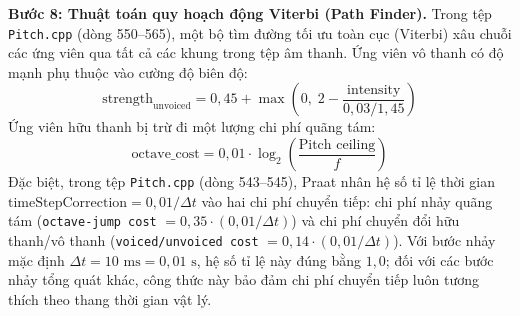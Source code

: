 \textbf{Bước 8: Thuật toán quy hoạch động Viterbi (Path Finder).}
Trong tệp \texttt{Pitch.cpp} (dòng 550--565), một bộ tìm đường tối ưu toàn cục (Viterbi) xâu chuỗi các ứng viên qua tất cả các khung trong tệp âm thanh. Ứng viên vô thanh có độ mạnh phụ thuộc vào cường độ biên độ:
\begin{equation}
\text{strength}_{\text{unvoiced}} = 0{,}45 + \max\left(0, \; 2 - \frac{\text{intensity}}{0{,}03 / 1{,}45}\right)
\end{equation}
Ứng viên hữu thanh bị trừ đi một lượng chi phí quãng tám:
\begin{equation}
\text{octave\_cost} = 0{,}01 \cdot \log_2\left(\frac{\text{Pitch ceiling}}{f}\right)
\end{equation}
Đặc biệt, trong tệp \texttt{Pitch.cpp} (dòng 543--545), Praat nhân hệ số tỉ lệ thời gian $\text{timeStepCorrection} = 0{,}01 / \Delta t$ vào hai chi phí chuyển tiếp: chi phí nhảy quãng tám (\texttt{octave-jump cost} $= 0{,}35 \cdot (0{,}01/\Delta t)$) và chi phí chuyển đổi hữu thanh/vô thanh (\texttt{voiced/unvoiced cost} $= 0{,}14 \cdot (0{,}01/\Delta t)$). Với bước nhảy mặc định $\Delta t = 10\text{ ms} = 0{,}01\text{ s}$, hệ số tỉ lệ này đúng bằng $1{,}0$; đối với các bước nhảy tổng quát khác, công thức này bảo đảm chi phí chuyển tiếp luôn tương thích theo thang thời gian vật lý.

